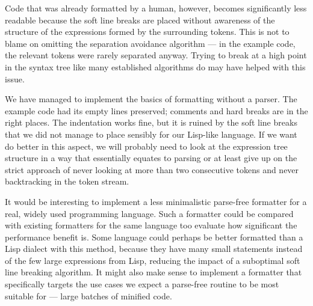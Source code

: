 Code that was already formatted by a human, however,
becomes significantly less readable
because the soft line breaks are placed
without awareness of the structure of the expressions
formed by the surrounding tokens.
This is not to blame on omitting the separation avoidance algorithm ---
in the example code, the relevant tokens were rarely separated anyway.
Trying to break at a high point in the syntax tree
like many established algorithms do
may have helped with this issue.

We have managed to implement the basics of formatting without a parser.
The example code had its empty lines preserved;
comments and hard breaks are in the right places.
The indentation works fine, but it is ruined by
the soft line breaks that we did not manage to place sensibly
for our Lisp-like language.
If we want do better in this aspect,
we will probably need to look at the expression tree structure
in a way that essentially equates to parsing
or at least give up on the strict approach
of never looking at more than two consecutive tokens
and never backtracking in the token stream.

It would be interesting to implement a
less minimalistic parse-free formatter
for a real, widely used programming language.
Such a formatter could be compared with
existing formatters for the same language
too evaluate how significant the performance benefit is.
Some language could perhaps be
better formatted than a Lisp dialect with this method,
because they have many small statements
instead of the few large expressions from Lisp,
reducing the impact of a suboptimal soft line breaking algorithm.
It might also make sense to implement a formatter
that specifically targets the use cases
we expect a parse-free routine to be most suitable for
--- large batches of minified code.
